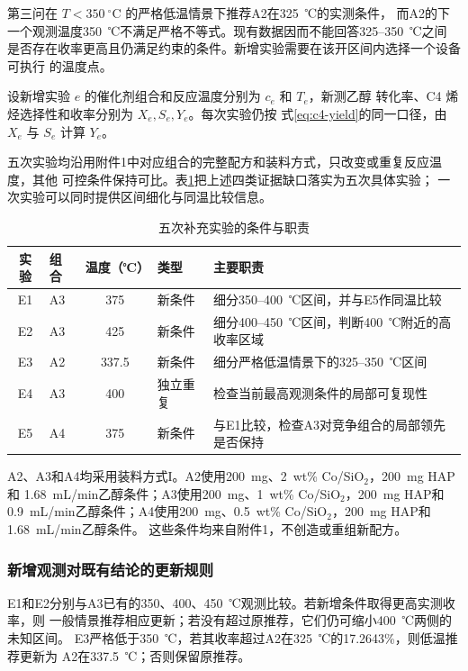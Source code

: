 第三问在 \(T<350~^\circ\mathrm{C}\) 的严格低温情景下推荐A2在325~℃的实测条件，
而A2的下一个观测温度350~℃不满足严格不等式。现有数据因而不能回答325--350~℃之间
是否存在收率更高且仍满足约束的条件。新增实验需要在该开区间内选择一个设备可执行
的温度点。

设新增实验 \(e\) 的催化剂组合和反应温度分别为 \(c_e\) 和 \(T_e\)，新测乙醇
转化率、C4 烯烃选择性和收率分别为 \(X_e,S_e,Y_e\)。每次实验仍按
式\eqref{eq:c4-yield}的同一口径，由 \(X_e\) 与 \(S_e\) 计算 \(Y_e\)。

五次实验均沿用附件1中对应组合的完整配方和装料方式，只改变或重复反应温度，其他
可控条件保持可比。表\ref{tab:q4-design}把上述四类证据缺口落实为五次具体实验；
一次实验可以同时提供区间细化与同温比较信息。

\begin{table}[H]
\centering
\caption{五次补充实验的条件与职责}
\label{tab:q4-design}
\begin{tabular}{clclp{7.0cm}}
\toprule
实验 & 组合 & 温度（℃） & 类型 & 主要职责 \\
\midrule
E1 & A3 & 375   & 新条件 & 细分350--400~℃区间，并与E5作同温比较 \\
E2 & A3 & 425   & 新条件 & 细分400--450~℃区间，判断400~℃附近的高收率区域 \\
E3 & A2 & 337.5 & 新条件 & 细分严格低温情景下的325--350~℃区间 \\
E4 & A3 & 400   & 独立重复 & 检查当前最高观测条件的局部可复现性 \\
E5 & A4 & 375   & 新条件 & 与E1比较，检查A3对竞争组合的局部领先是否保持 \\
\bottomrule
\end{tabular}
\end{table}

A2、A3和A4均采用装料方式I。A2使用200~mg、2~wt\% Co/SiO\(_2\)，200~mg HAP和
1.68~mL/min乙醇条件；A3使用200~mg、1~wt\% Co/SiO\(_2\)，200~mg HAP和
0.9~mL/min乙醇条件；A4使用200~mg、0.5~wt\% Co/SiO\(_2\)，200~mg HAP和
1.68~mL/min乙醇条件。
这些条件均来自附件1，不创造或重组新配方。

\subsubsection{新增观测对既有结论的更新规则}

E1和E2分别与A3已有的350、400、450~℃观测比较。若新增条件取得更高实测收率，则
一般情景推荐相应更新；若没有超过原推荐，它们仍可缩小400~℃两侧的未知区间。
E3严格低于350~℃，若其收率超过A2在325~℃的17.2643\%，则低温推荐更新为
A2在337.5~℃；否则保留原推荐。

